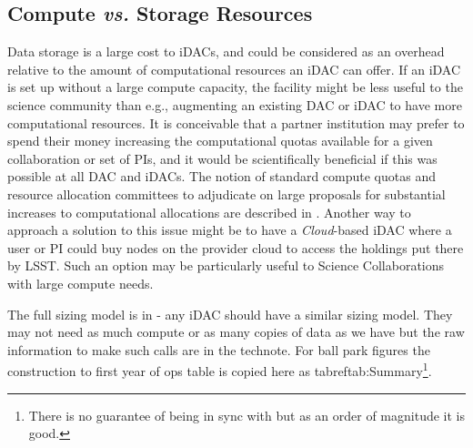 \subsection{Compute {\it vs.} Storage Resources} \label{sec:cvs}
Data storage is a large cost to iDACs, and could be considered as an overhead relative to the amount of computational resources an iDAC can offer. If an iDAC is set up without a large compute capacity, the facility might be less useful to the science community than e.g., augmenting an existing DAC or iDAC to have more computational resources. It is conceivable that a partner institution may prefer to spend their money increasing the computational quotas available for a given collaboration or set of PIs, and it would be scientifically beneficial if this was possible at all DAC and iDACs. The notion of standard compute quotas and resource allocation committees to adjudicate on large proposals for substantial increases to computational allocations are described in . Another way to approach a solution to this issue might be to have a \emph{Cloud}-based iDAC where a user or PI could buy nodes on the provider cloud to access the holdings put there by LSST.  Such an option may be particularly useful to Science Collaborations with large compute needs.

The full sizing model is in  - any iDAC should have a similar sizing model. They may not need as much compute or as many copies of data as we have but the raw information to make such calls are in the technote.  For ball park figures the construction
to first year of ops table is copied here as tabref{tab:Summary}\footnote{ There is no guarantee of being in sync with  but as an order of magnitude it is good.}.


